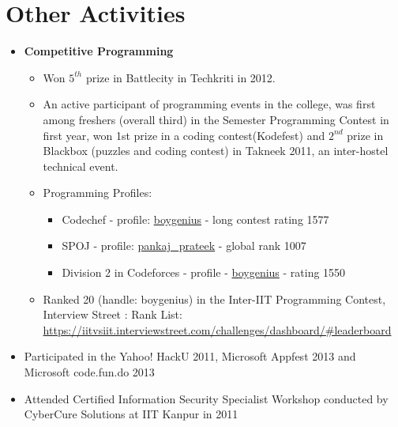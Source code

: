 \documentclass[margin,line]{resume}
\begin{document}
\begin{resume}
\begin{itemize}
  \end{itemize}

  
  \section{\mysidestyle Other Activities}
  
  \begin{itemize}
    
  \item  \textbf{\textsf Competitive Programming}
    \begin{itemize}
    \item Won $5^{th}$ prize in Battlecity in Techkriti in 2012.
    \item An active participant of programming events in the college, was first among freshers (overall third) in the Semester Programming Contest in first year, won 1st prize in a coding contest(Kodefest) and $2^{nd}$ prize in Blackbox (puzzles and coding contest) in Takneek 2011, an inter-hostel technical event.
    \item Programming Profiles:       
      \begin{itemize}
      \item Codechef - profile: \href{http://codechef.com/users/boygenius}{boygenius} - long contest rating 1577 %
      \item SPOJ - profile: \href{http://spoj.com/users/pankaj\_prateek}{pankaj\_prateek} - global rank 1007
      \item Division 2 in Codeforces - profile - \href{http://codeforces.com/profile/boygenius}{boygenius} - rating 1550%
      \end{itemize}
    \item Ranked 20 (handle: boygenius) in the Inter-IIT Programming Contest, Interview Street : Rank List: \url{https://iitvsiit.interviewstreet.com/challenges/dashboard/#leaderboard}
    \end{itemize}
  \item Participated in the Yahoo! HackU 2011, Microsoft Appfest 2013 and Microsoft code.fun.do 2013
  \item Attended Certified Information Security Specialist Workshop conducted by CyberCure Solutions at IIT Kanpur in 2011


\end{itemize}
\end{resume}
\end{document}

